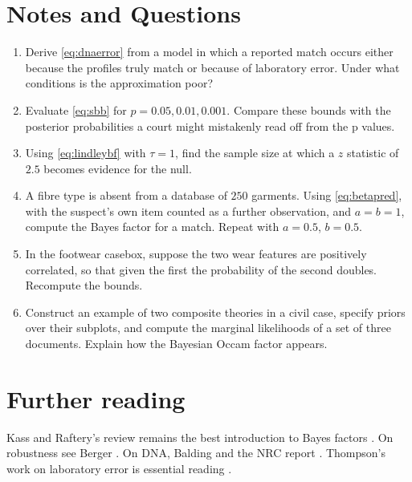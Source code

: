 \section*{Notes and Questions}
\begin{enumerate}[label=\arabic*.]
\item Derive \eqref{eq:dnaerror} from a model in which a reported match occurs either because the profiles truly match or because of laboratory error. Under what conditions is the approximation poor?
\item Evaluate \eqref{eq:sbb} for $p = 0.05, 0.01, 0.001$. Compare these bounds with the posterior probabilities a court might mistakenly read off from the p values.
\item Using \eqref{eq:lindleybf} with $\tau = 1$, find the sample size at which a $z$ statistic of $2.5$ becomes evidence for the null.
\item A fibre type is absent from a database of $250$ garments. Using \eqref{eq:betapred}, with the suspect's own item counted as a further observation, and $a = b = 1$, compute the Bayes factor for a match. Repeat with $a = 0.5$, $b = 0.5$.
\item In the footwear casebox, suppose the two wear features are positively correlated, so that given the first the probability of the second doubles. Recompute the bounds.
\item Construct an example of two composite theories in a civil case, specify priors over their subplots, and compute the marginal likelihoods of a set of three documents. Explain how the Bayesian Occam factor appears.
\end{enumerate}

\section*{Further reading}
Kass and Raftery's review remains the best introduction to Bayes factors \citep{kass1995}. On robustness see Berger \citep{berger1994}. On DNA, Balding \citep{balding2005} and the NRC report \citep{nrc1996}. Thompson's work on laboratory error is essential reading \citep{thompson2003}.
